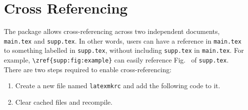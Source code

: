 \chapter{Cross Referencing}
\label{content:crossreferencing}

The \elsatoolbox{} package allows cross-referencing across two independent documents, \texttt{main.tex} and \texttt{supp.tex}. In other words, users can have a reference in \texttt{main.tex} to something labelled in \texttt{supp.tex}, without including \texttt{supp.tex} in \texttt{main.tex}. For example, \verb|\zref{supp:fig:example}| can easily reference Fig.~ of \texttt{supp.tex}. There are two steps required to enable cross-referencing:
\begin{enumerate}
    \item Create a new file named \texttt{latexmkrc} and add the following code to it.
    \item Clear cached files and recompile.
\end{enumerate}

